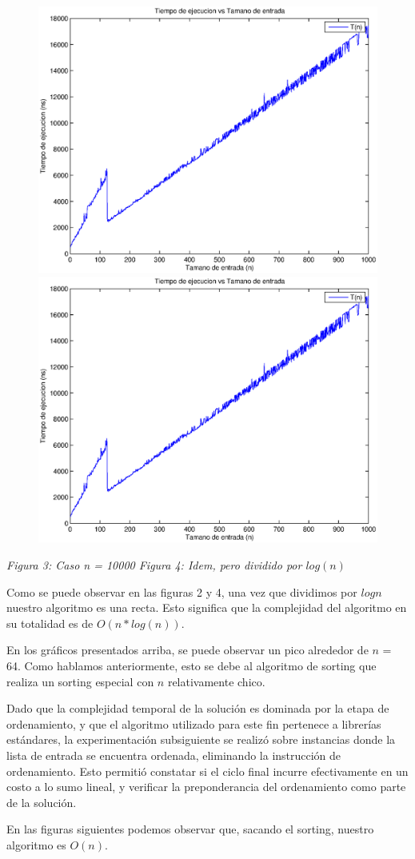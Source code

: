 \begin{figure}[H]
    \includegraphics[width=0.5\linewidth]{problema1/graficos/problema1_aleatoria_1000.eps}
    \includegraphics[width=0.5\linewidth]{problema1/graficos/problema1_aleatoria_1000.eps}
\end{figure}
\emph{\hspace{2,5cm}Figura 3: Caso n = 10000 \hspace{2,5cm}Figura 4: Idem, pero dividido por $log(n)$}

Como se puede observar en las figuras 2 y 4, una vez que dividimos por $log n$ nuestro algoritmo es una recta. Esto significa que la complejidad del algoritmo en su totalidad es de $O(n * log(n))$.

En los gráficos presentados arriba, se puede observar un pico alrededor de $n$ = 64. Como hablamos anteriormente, esto se debe al algoritmo de sorting que realiza un sorting especial con $n$ relativamente chico.

Dado que la complejidad temporal de la solución es dominada por la etapa de ordenamiento, y que el algoritmo utilizado para este fin pertenece a librerías estándares, la experimentación subsiguiente se realizó sobre instancias donde la lista de entrada se encuentra ordenada, eliminando la instrucción de ordenamiento. Esto permitió constatar si el ciclo final incurre efectivamente en un costo a lo sumo lineal, y verificar la preponderancia del ordenamiento como parte de la solución.

En las figuras siguientes podemos observar que, sacando el sorting, nuestro algoritmo es $O(n)$.

